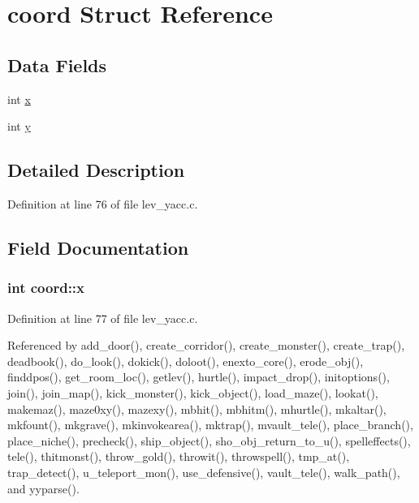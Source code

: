 \hypertarget{structcoord}{\section{coord Struct Reference}
\label{structcoord}
}
\subsection*{Data Fields}
\begin{DoxyCompactItemize}
\item 
int \hyperlink{structcoord_ac3e93ff628aa19d2888c5f6fa26f430d}{x}
\item 
int \hyperlink{structcoord_a2b099692d87f98e4844b615136ca37fb}{y}
\end{DoxyCompactItemize}


\subsection{Detailed Description}


Definition at line 76 of file lev\+\_\+yacc.\+c.



\subsection{Field Documentation}
\hypertarget{structcoord_ac3e93ff628aa19d2888c5f6fa26f430d}{
\subsubsection[{x}]{\setlength{\rightskip}{0pt plus 5cm}int coord\+::x}}\label{structcoord_ac3e93ff628aa19d2888c5f6fa26f430d}


Definition at line 77 of file lev\+\_\+yacc.\+c.



Referenced by add\+\_\+door(), create\+\_\+corridor(), create\+\_\+monster(), create\+\_\+trap(), deadbook(), do\+\_\+look(), dokick(), doloot(), enexto\+\_\+core(), erode\+\_\+obj(), finddpos(), get\+\_\+room\+\_\+loc(), getlev(), hurtle(), impact\+\_\+drop(), initoptions(), join(), join\+\_\+map(), kick\+\_\+monster(), kick\+\_\+object(), load\+\_\+maze(), lookat(), makemaz(), maze0xy(), mazexy(), mbhit(), mbhitm(), mhurtle(), mkaltar(), mkfount(), mkgrave(), mkinvokearea(), mktrap(), mvault\+\_\+tele(), place\+\_\+branch(), place\+\_\+niche(), precheck(), ship\+\_\+object(), sho\+\_\+obj\+\_\+return\+\_\+to\+\_\+u(), spelleffects(), tele(), thitmonst(), throw\+\_\+gold(), throwit(), throwspell(), tmp\+\_\+at(), trap\+\_\+detect(), u\+\_\+teleport\+\_\+mon(), use\+\_\+defensive(), vault\+\_\+tele(), walk\+\_\+path(), and yyparse().


